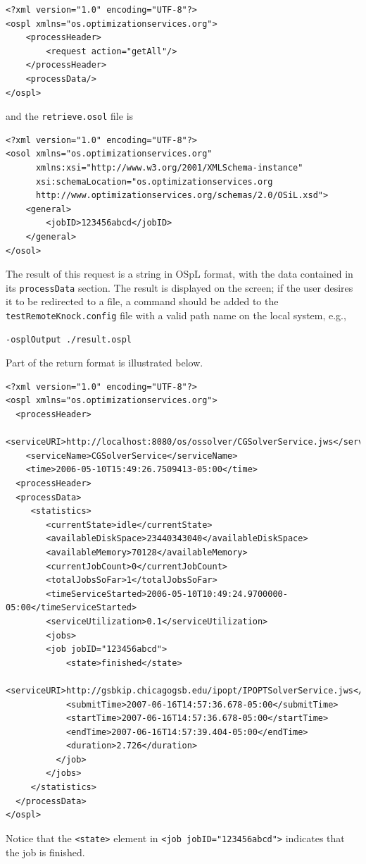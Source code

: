 \documentclass[11pt]{article}
\renewcommand{\_}{{\char"5F}}
\renewcommand{\{}{{\char"7B}}
\renewcommand{\}}{{\char"7D}}
\renewcommand{\^}{{\char"0D}}
\renewcommand{\'}{{\char"0D}}
\begin{document}
\begin{enumerate}[Step 1:]
\begin{verbatim}
<?xml version="1.0" encoding="UTF-8"?>
<ospl xmlns="os.optimizationservices.org">
    <processHeader>
        <request action="getAll"/>
    </processHeader>
    <processData/>
</ospl>
\end{verbatim}
and the {\tt retrieve.osol} file is
\begin{verbatim}
<?xml version="1.0" encoding="UTF-8"?>
<osol xmlns="os.optimizationservices.org"
      xmlns:xsi="http://www.w3.org/2001/XMLSchema-instance"
      xsi:schemaLocation="os.optimizationservices.org
      http://www.optimizationservices.org/schemas/2.0/OSiL.xsd">
    <general>
        <jobID>123456abcd</jobID>
    </general>
</osol>
\end{verbatim}

The result of this request is a string in OSpL format, with the data contained in its
{\tt processData} section.  The result is displayed on the screen; if the user desires it
to be redirected to a file, a command should be added to the {\tt testRemoteKnock.config}
file with a valid path name on the local system, e.g.,

\begin{verbatim}
-osplOutput ./result.ospl
\end{verbatim}

Part of the return format is illustrated below.


\begin{verbatim}
<?xml version="1.0" encoding="UTF-8"?>
<ospl xmlns="os.optimizationservices.org">
  <processHeader>
    <serviceURI>http://localhost:8080/os/ossolver/CGSolverService.jws</serviceURI>
    <serviceName>CGSolverService</serviceName>
    <time>2006-05-10T15:49:26.7509413-05:00</time>
  <processHeader>
  <processData>
     <statistics>
        <currentState>idle</currentState>
        <availableDiskSpace>23440343040</availableDiskSpace>
        <availableMemory>70128</availableMemory>
        <currentJobCount>0</currentJobCount>
        <totalJobsSoFar>1</totalJobsSoFar>
        <timeServiceStarted>2006-05-10T10:49:24.9700000-05:00</timeServiceStarted>
        <serviceUtilization>0.1</serviceUtilization>
        <jobs>
        <job jobID="123456abcd">
            <state>finished</state>
            <serviceURI>http://gsbkip.chicagogsb.edu/ipopt/IPOPTSolverService.jws</serviceURI>
            <submitTime>2007-06-16T14:57:36.678-05:00</submitTime>
            <startTime>2007-06-16T14:57:36.678-05:00</startTime>
            <endTime>2007-06-16T14:57:39.404-05:00</endTime>
            <duration>2.726</duration>
          </job>
        </jobs>
     </statistics>
  </processData>
</ospl>
\end{verbatim}
Notice that the {\tt <state>} element in {\tt <job jobID="123456abcd">} indicates that the job is finished.


\end{enumerate}
\end{document}
